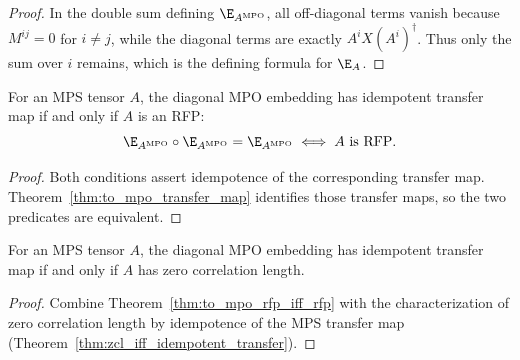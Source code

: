 \begin{proof}
    \leanok
    In the double sum defining $\E_{A^{\mathrm{MPO}}}$, all off-diagonal terms
    vanish because $M^{ij} = 0$ for $i \ne j$, while the diagonal terms are
    exactly $A^i X (A^i)^\dagger$. Thus only the sum over $i$ remains, which
    is the defining formula for $\E_A$.
\end{proof}

\begin{theorem}%
    \label{thm:to_mpo_rfp_iff_rfp}
    \leanok
    For an MPS tensor $A$, the diagonal MPO embedding has idempotent transfer
    map if and only if $A$ is an RFP:
    \[
        \E_{A^{\mathrm{MPO}}}\circ\E_{A^{\mathrm{MPO}}}
        = \E_{A^{\mathrm{MPO}}}
        \iff A \text{ is RFP}.
    \]
\end{theorem}

\begin{proof}
    \leanok
    Both conditions assert idempotence of the corresponding transfer map.
    Theorem~\ref{thm:to_mpo_transfer_map} identifies those transfer maps, so
    the two predicates are equivalent.
\end{proof}

\begin{theorem}%
    \label{thm:to_mpo_rfp_iff_zcl}
    \leanok
    For an MPS tensor $A$, the diagonal MPO embedding has idempotent transfer
    map if and only if $A$ has zero correlation length.
\end{theorem}

\begin{proof}
    \leanok
    Combine Theorem~\ref{thm:to_mpo_rfp_iff_rfp} with the characterization of
    zero correlation length by idempotence of the MPS transfer map
    (Theorem~\ref{thm:zcl_iff_idempotent_transfer}).
\end{proof}
